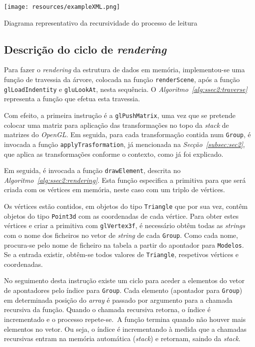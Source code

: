 \begin{center}
\texttt{[image: resources/exampleXML.png]}
\captionsetup{type=figure, width=0.8\linewidth}
\caption{Diagrama representativo da recursividade do processo de leitura}
\label{fig:ssec2:recleitura} 
\end{center}


\newpage
\subsection{Descrição do ciclo de \emph{rendering}}



Para fazer o \emph{rendering} da estrutura de dados em memória, implementou-se
uma função de travessia da árvore, colocada na função \texttt{renderScene}, após
a função \texttt{glLoadIndentity} e \texttt{gluLookAt}, nesta sequência.
O \emph{Algoritmo~\ref{alg:ssec2:traverse}} representa a função que efetua esta
travessia.

Com efeito, a primeira instrução é a \texttt{glPushMatrix}, uma vez que se
pretende colocar uma matriz para aplicação das transformações no topo da
\emph{stack} de matrizes do \emph{OpenGL}. Em seguida, para cada transformação
contida num \texttt{Group}, é invocada a função \texttt{applyTrasformation}, já
mencionada na \emph{Secção~\ref{subsec:sec2}}, que aplica as transformações
conforme o contexto, como já foi explicado.

Em seguida, é invocada a função \texttt{drawElement}, descrita no
\emph{Algoritmo~\ref{alg:ssec2:rendering}}. Esta função especifica a primitiva
para que será criada com os vértices em memória, neste caso com um triplo de
vértices. 


Os vértices estão contidos, em objetos do tipo \texttt{Triangle} que
por sua vez, contêm objetos do tipo \texttt{Point3d} com as coordenadas de cada
vértice. Para obter estes vértices e criar a primitiva com \texttt{glVertex3f},
é necessário obtêm todas as \emph{strings} com o nome dos ficheiros no vetor de
\emph{string} de cada \texttt{Group}. Como cada nome, procura-se pelo
nome de ficheiro na tabela a partir do apontador para \texttt{Modelos}. Se
a entrada existir, obtêm-se todos valores de \texttt{Triangle}, respetivos
vértices e coordenadas.

No seguimento desta instrução existe um ciclo para aceder a elementos do vetor
de apontadores pelo índice para \texttt{Group}. Cada elemento (apontador para
\texttt{Group}) em determinada posição do \emph{array} é passado por argumento
para a chamada recursiva da função. Quando o chamada recursiva retorna, o índice
é incrementado e o processo repete-se.\ A função termina quando não houver mais
elementos no vetor.  Ou seja, o índice é incrementando à medida que
a chamadas recursivas entram na memória automática (\emph{stack}) e retornam,
saindo da \emph{stack}. 

